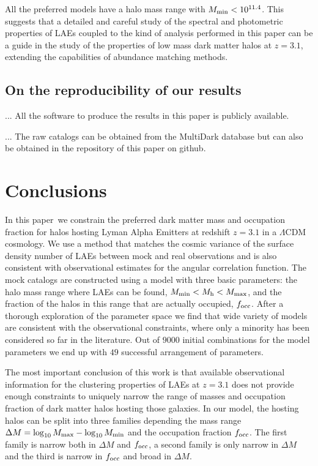 \documentclass[usenatbib]{mn2e}
\newcommand{\documentname}{paper~}
\newcommand{\hMsun}{{\ifmmode{h^{-1}{\rm
        {M_{\odot}}}}\else{$h^{-1}{\rm{M_{\odot}}}$}\fi}}
\begin{document}
All the preferred models have a halo mass range with $M_{\rm
  min}<10^{11.4}$\hMsun. This suggests that a detailed and careful
study of the spectral and photometric properties of LAEs coupled to the kind of
analysis performed in this paper can be a guide in the study of the
properties of low mass dark matter halos at $z=3.1$, extending the
capabilities of abundance matching methods.


\subsection{On the reproducibility of our results}

... All the software to produce the results in this paper is publicly
available. 

... The raw catalogs can be obtained from the MultiDark database but
can also be obtained in the repository of this paper on github.

\section{Conclusions}
\label{sec:conclusions}

In this \documentname we constrain the preferred dark matter mass
and occupation fraction for halos hosting Lyman Alpha Emitters at
redshift $z=3.1$ in a $\Lambda$CDM cosmology. We use a method that
matches the cosmic variance of the surface 
density number of LAEs between mock and real observations and is also
consistent with observational estimates for the angular
correlation function. The mock catalogs are constructed using a 
model with three basic parameters: the halo mass range where LAEs can
be found, $M_{\rm   min}<M_{\rm h}<M_{\rm   max}$, and the fraction of
the halos in this range that are actually occupied, $f_{\rm occ}$. After
a thorough exploration of the parameter space we find that wide
variety of models are consistent with the observational constraints,
where only a minority has been considered so far in the
literature. Out of $9000$ initial combinations for the model
parameters we end up with $49$ successful arrangement of parameters.


The most important conclusion of this work is that available
observational information for the clustering properties of LAEs at
$z=3.1$ does not provide enough constraints to uniquely narrow the range of masses
and occupation fraction of dark matter halos hosting those galaxies. In our
model, the hosting halos can be split into three families depending the mass range
$\Delta M=\log_{10}M_{\rm max} - \log_{10}M_{\rm min}$ and the
occupation fraction $f_{\rm occ}$. The first family is narrow both in
$\Delta M$ and $f_{\rm occ}$, a second family is only narrow in
$\Delta M$ and the third is narrow in $f_{\rm occ}$ and broad in
$\Delta M$. 
\end{document}
